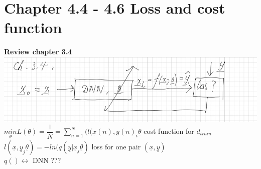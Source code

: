 \section{Chapter 4.4 - 4.6 Loss and cost function}
\textbf{Review chapter 3.4}	\\
\includegraphics[width=\linewidth]{Images/ProbabalisticFrameworkSupervisedLearning.png}\\
$ \underset{\underline{\theta}}{min}  L ( \underline{\theta  }) =  \dfrac{1}{N} = \sum_{n=1}^{N} (l(\underline{x}(n), y(n)_i \underline{\theta}$     cost function for $ d_{train } $ \\
$l(\underline{x}, \underline{y}_j \underline{\theta }) = - ln(q ( \underline{y} | \underline{x}_j \underline{\theta } )  $ loss for one pair $  (\underline{x}, \underline{y})  $ \\
$  q () \leftrightarrow $ DNN ???
